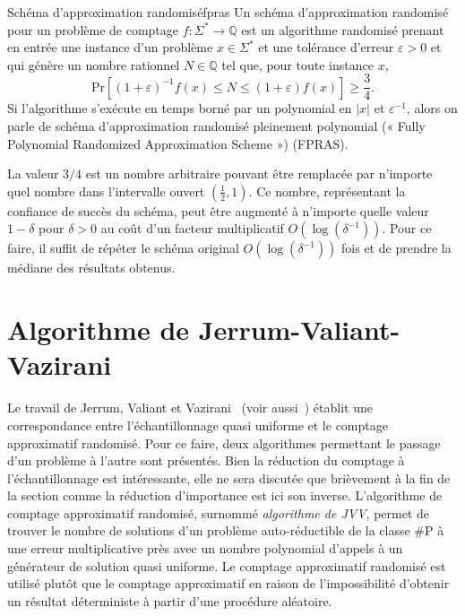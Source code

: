 \begin{maindefinition}{Schéma d'approximation randomisé}{fpras}
    Un schéma d'approximation randomisé pour un problème de comptage $f: \Sigma^{*} \to \mathbb{Q}$ est un algorithme randomisé prenant en entrée une instance d'un problème $x \in \Sigma^{*}$ et une tolérance d'erreur $\varepsilon > 0$ et qui génère un nombre rationnel $N \in \mathbb{Q}$ tel que, pour toute instance $x$,
    \begin{equation*}
        \mathrm{ Pr }\left[(1+\varepsilon)^{-1} f(x) \leq N \leq (1+\varepsilon)f(x)\right] \geq \frac{3}{4} .
    \end{equation*}
    Si l'algorithme s'exécute en temps borné par un polynomial en $\lvert x \rvert$ et $\varepsilon^{-1}$, alors on parle de schéma d'approximation randomisé pleinement polynomial (« Fully Polynomial Randomized Approximation Scheme ») (FPRAS).
\end{maindefinition}

La valeur $3/4$ est un nombre arbitraire pouvant être remplacée par n'importe quel nombre dans l'intervalle ouvert $(\frac{1}{2}, 1)$. Ce nombre, représentant la confiance de succès du schéma, peut être augmenté à n'importe quelle valeur $1-\delta$ pour $\delta > 0$ au coût d'un facteur multiplicatif $O(\log(\delta^{-1}))$. Pour ce faire, il suffit de répéter le schéma original $O(\log(\delta^{-1}))$ fois et de prendre la médiane des résultats obtenus.   


\section{Algorithme de Jerrum-Valiant-Vazirani}
\label{sec:algorithme-jvv}

Le travail de Jerrum, Valiant et Vazirani~\cite{jerrumRandomGenerationCombinatorial1986} (voir aussi~\cite{broderHowHardIt1986, sinclairAlgorithmsRandomGeneration1993}) établit une correspondance entre l'échantillonnage quasi uniforme et le comptage approximatif randomisé. Pour ce faire, deux algorithmes permettant le passage d'un problème à l'autre sont présentés. Bien la réduction du comptage à l'échantillonnage est intéressante, elle ne sera discutée que brièvement à la fin de la section comme la réduction d'importance est ici son inverse. L'algorithme de comptage approximatif randomisé, surnommé \textit{algorithme de JVV}, permet de trouver le nombre de solutions d'un problème auto-réductible de la classe \textsf{\#P} à une erreur multiplicative près avec un nombre polynomial d'appels à un générateur de solution quasi uniforme. Le comptage approximatif randomisé est utilisé plutôt que le comptage approximatif en raison de l'impossibilité d'obtenir un résultat déterministe à partir d'une procédure aléatoire.

